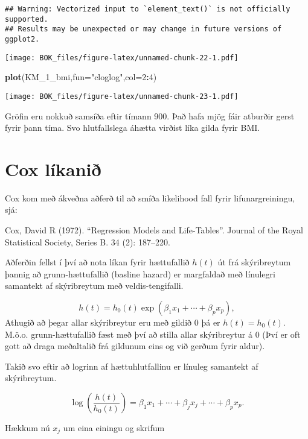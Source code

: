 \documentclass[
]{book}
\newenvironment{Shaded}{\begin{snugshade}}{\end{snugshade}}
\newcommand{\DataTypeTok}[1]{\textcolor[rgb]{0.13,0.29,0.53}{#1}}
\newcommand{\DecValTok}[1]{\textcolor[rgb]{0.00,0.00,0.81}{#1}}
\newcommand{\KeywordTok}[1]{\textcolor[rgb]{0.13,0.29,0.53}{\textbf{#1}}}
\newcommand{\NormalTok}[1]{#1}
\newcommand{\OperatorTok}[1]{\textcolor[rgb]{0.81,0.36,0.00}{\textbf{#1}}}
\newcommand{\StringTok}[1]{\textcolor[rgb]{0.31,0.60,0.02}{#1}}
\begin{document}
\begin{verbatim}
## Warning: Vectorized input to `element_text()` is not officially supported.
## Results may be unexpected or may change in future versions of ggplot2.
\end{verbatim}

\texttt{[image: BOK\_files/figure-latex/unnamed-chunk-22-1.pdf]}

\begin{Shaded}
\begin{Highlighting}[]
\KeywordTok{plot}\NormalTok{(KM_}\DecValTok{1}\NormalTok{_bmi,}\DataTypeTok{fun=}\StringTok{"cloglog"}\NormalTok{,}\DataTypeTok{col=}\DecValTok{2}\OperatorTok{:}\DecValTok{4}\NormalTok{)}
\end{Highlighting}
\end{Shaded}

\texttt{[image: BOK\_files/figure-latex/unnamed-chunk-23-1.pdf]}

Gröfin eru nokkuð samsíða eftir tímann 900. Það hafa mjög fáir atburðir gerst fyrir þann tíma. Svo hlutfallslega áhætta virðist líka gilda fyrir BMI.

\hypertarget{cox}{%
\chapter{Cox líkanið}\label{cox}}

Cox kom með ákveðna aðferð til að smíða likelihood fall fyrir lifunargreiningu, sjá:

Cox, David R (1972). ``Regression Models and Life-Tables''. Journal of the Royal Statistical Society, Series B. 34 (2): 187--220.

Aðferðin fellst í því að nota líkan fyrir hættufallið \(h(t)\) út frá skýribreytum þannig að grunn-hættufallið (basline hazard) er margfaldað með línulegri samantekt af skýribreytum með veldis-tengifalli.

\[
h(t) = h_0(t) \exp(\beta_1 x_1 + \cdots + \beta_p x_p),
\]
Athugið að þegar allar skýribreytur eru með gildið 0 þá er \(h(t) = h_0(t)\). M.ö.o. grunn-hættufallið fæst með því að stilla allar skýribreytur á 0 (Því er oft gott að draga meðaltalið frá gildunum eins og við gerðum fyrir aldur).

Takið svo eftir að logrinn af hættuhlutfallinu er línuleg samantekt af skýribreytum.

\[
\log \left( \frac{h(t)}{h_0(t)} \right) = \beta_1 x_1 + \cdots + \beta_j x_j + \cdots + \beta_p x_p.
\]

Hækkum nú \(x_j\) um eina einingu og skrifum
\end{document}
